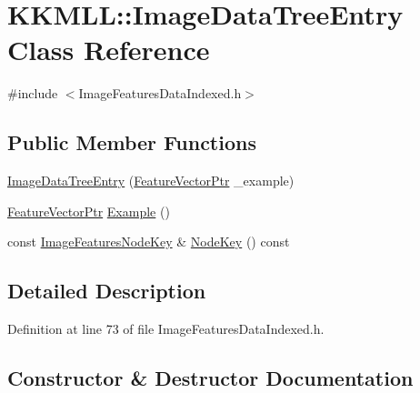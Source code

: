 \hypertarget{class_k_k_m_l_l_1_1_image_data_tree_entry}{}\section{K\+K\+M\+LL\+:\+:Image\+Data\+Tree\+Entry Class Reference}
\label{class_k_k_m_l_l_1_1_image_data_tree_entry}


{\ttfamily \#include $<$Image\+Features\+Data\+Indexed.\+h$>$}

\subsection*{Public Member Functions}
\begin{DoxyCompactItemize}
\item 
\hyperlink{class_k_k_m_l_l_1_1_image_data_tree_entry_a6c22d546199471b77d804fd1bbd713bc}{Image\+Data\+Tree\+Entry} (\hyperlink{namespace_k_k_m_l_l_a0c5df3d48f45926fbc4fee04f5e3bc04}{Feature\+Vector\+Ptr} \+\_\+example)
\item 
\hyperlink{namespace_k_k_m_l_l_a0c5df3d48f45926fbc4fee04f5e3bc04}{Feature\+Vector\+Ptr} \hyperlink{class_k_k_m_l_l_1_1_image_data_tree_entry_a073e4a8176016d81e3b4c7820c420260}{Example} ()
\item 
const \hyperlink{class_k_k_m_l_l_1_1_image_features_node_key}{Image\+Features\+Node\+Key} \& \hyperlink{class_k_k_m_l_l_1_1_image_data_tree_entry_a467cda3bd60ce96ac9202923ace836c8}{Node\+Key} () const 
\end{DoxyCompactItemize}


\subsection{Detailed Description}


Definition at line 73 of file Image\+Features\+Data\+Indexed.\+h.



\subsection{Constructor \& Destructor Documentation}
